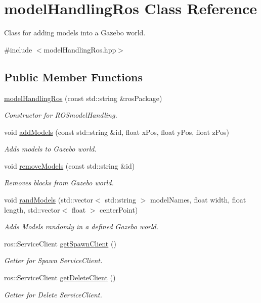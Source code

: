\hypertarget{classmodelHandlingRos}{}\section{model\+Handling\+Ros Class Reference}
\label{classmodelHandlingRos}


Class for adding models into a Gazebo world.  




{\ttfamily \#include $<$model\+Handling\+Ros.\+hpp$>$}

\subsection*{Public Member Functions}
\begin{DoxyCompactItemize}
\item 
\hyperlink{classmodelHandlingRos_afbacc3a052c5e0e1be563ab53d9736d4}{model\+Handling\+Ros} (const std\+::string \&ros\+Package)
\begin{DoxyCompactList}\small\item\em Constructor for R\+O\+Smodel\+Handling. \end{DoxyCompactList}\item 
void \hyperlink{classmodelHandlingRos_ad8e5f372e54d598d9be2c19656292fe9}{add\+Models} (const std\+::string \&id, float x\+Pos, float y\+Pos, float z\+Pos)
\begin{DoxyCompactList}\small\item\em Adds models to Gazebo world. \end{DoxyCompactList}\item 
void \hyperlink{classmodelHandlingRos_a6fe4e2adf9d1a226888f2858f2641163}{remove\+Models} (const std\+::string \&id)
\begin{DoxyCompactList}\small\item\em Removes blocks from Gazebo world. \end{DoxyCompactList}\item 
void \hyperlink{classmodelHandlingRos_aedbe976dfa2d5fede923966d70425a14}{rand\+Models} (std\+::vector$<$ std\+::string $>$ model\+Names, float width, float length, std\+::vector$<$ float $>$ center\+Point)
\begin{DoxyCompactList}\small\item\em Adds Models randomly in a defined Gazebo world. \end{DoxyCompactList}\item 
ros\+::\+Service\+Client \hyperlink{classmodelHandlingRos_a8312b68f0278e960517d83e4d6109834}{get\+Spawn\+Client} ()
\begin{DoxyCompactList}\small\item\em Getter for Spawn Service\+Client. \end{DoxyCompactList}\item 
ros\+::\+Service\+Client \hyperlink{classmodelHandlingRos_aabcafdeb6314ef9241a09a9739caf22a}{get\+Delete\+Client} ()
\begin{DoxyCompactList}\small\item\em Getter for Delete Service\+Client. \end{DoxyCompactList}\end{DoxyCompactItemize}
